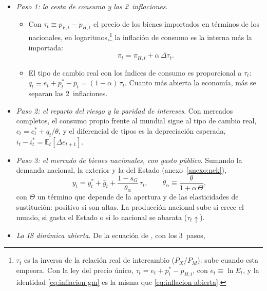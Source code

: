 \documentclass[11pt]{article}
\begin{document}
\begin{itemize}
\item \emph{Paso 1: la cesta de consumo y las 2~inflaciones}.
  \begin{itemize}
  \item Con $\tau_t\equiv p_{F,t}-p_{H,t}$ el precio de los bienes importados en términos de los nacionales, en logaritmos,\footnote{$\tau_t$ es la inversa de la relación real de intercambio ($P_X/P_M$): sube cuando esta empeora. Con la ley del precio único, $\tau_t=e_t+p^*_t-p_{H,t}$, con $e_t\equiv\ln E_t$, y la identidad \eqref{eq:inflacion-gm} es la misma que \eqref{eq:inflacion-abierta}.} la inflación de consumo es la interna más la importada:
  \begin{equation}
  \pi_t=\pi_{H,t}+\alpha\,\Delta\tau_t . \label{eq:inflacion-gm}
  \end{equation}
  \item El tipo de cambio real con los índices de consumo es proporcional a $\tau_t$: $q_t\equiv e_t+p^*_t-p_t=(1-\alpha)\,\tau_t$. Cuanto más abierta la economía, más se separan las 2~inflaciones.
  \end{itemize}
\item \emph{Paso 2: el reparto del riesgo y la paridad de intereses}. Con mercados completos, el consumo propio frente al mundial sigue al tipo de cambio real, $c_t=c^*_t+q_t/\theta$, y el diferencial de tipos es la depreciación esperada, $i_t-i^*_t=\mathbb{E}_t[\Delta e_{t+1}]$.
\item \emph{Paso 3: el mercado de bienes nacionales, con gasto público}. Sumando la demanda nacional, la exterior y la del Estado (anexo~\ref{anexo:nek}),
  \begin{equation}
  y_t=y^*_t+\hat g_t+\frac{1-s_G}{\theta_\alpha}\,\tau_t ,\qquad \theta_{\alpha}\equiv\frac{\theta}{1+\alpha\,\Theta} , \label{eq:vaciado-gm}
  \end{equation}
  con $\Theta$ un término que depende de la apertura y de las elasticidades de sustitución: positivo si son altas. La producción nacional sube si crece el mundo, si gasta el Estado o si lo nacional se abarata ($\tau_t\uparrow$).
\item \emph{La IS dinámica abierta}. De la ecuación de , con los 3~pasos,
  \begin{itemize}

\end{itemize}
\end{itemize}
\end{document}
